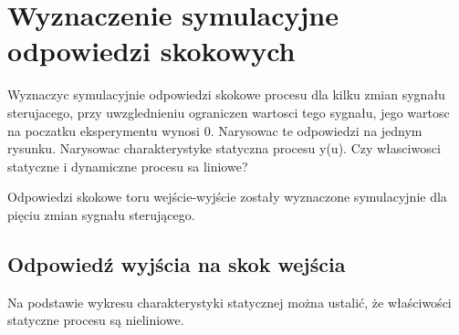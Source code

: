 \section{Wyznaczenie symulacyjne odpowiedzi skokowych}
\label{projekt:zad2}

Wyznaczyc symulacyjnie odpowiedzi skokowe procesu dla kilku zmian sygnału sterujacego,
przy uwzglednieniu ograniczen wartosci tego sygnału, jego wartosc na poczatku
eksperymentu wynosi 0. Narysowac te odpowiedzi na jednym rysunku. Narysowac charakterystyke
statyczna procesu y(u). Czy własciwosci statyczne i dynamiczne procesu
sa liniowe?

Odpowiedzi skokowe toru wejście-wyjście zostały wyznaczone
symulacyjnie dla pięciu zmian sygnału sterującego.

\subsection{Odpowiedź wyjścia na skok wejścia}
\label{projekt:zad2:StepYU}

%     

Na podstawie wykresu charakterystyki statycznej można ustalić, że właściwości
statyczne procesu są nieliniowe. \newline

\newpage
